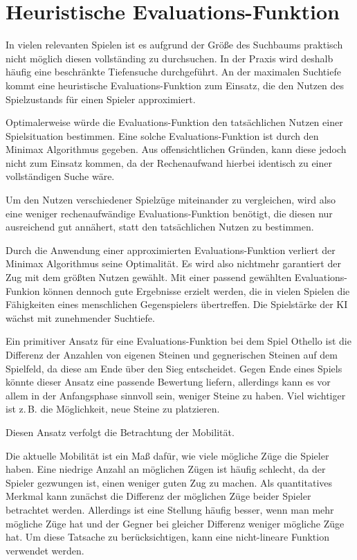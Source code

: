 \section{Heuristische Evaluations-Funktion}
\label{sec:heuristic}

In vielen relevanten Spielen ist es aufgrund der Größe des Suchbaums praktisch nicht möglich diesen vollständing zu
durchsuchen. In der Praxis wird deshalb häufig eine beschränkte Tiefensuche durchgeführt. An der maximalen Suchtiefe kommt
eine heuristische Evaluations-Funktion zum Einsatz, die den Nutzen des Spielzustands für einen Spieler approximiert.
\cite[S.~171]{ai2010russel}

Optimalerweise würde die Evaluations-Funktion den tatsächlichen Nutzen einer Spielsituation bestimmen. Eine solche
Evaluations-Funktion ist durch den Minimax Algorithmus gegeben. Aus offensichtlichen Gründen, kann diese jedoch nicht
zum Einsatz kommen, da der Rechenaufwand hierbei identisch zu einer vollständigen Suche wäre.

Um den Nutzen verschiedener Spielzüge miteinander zu vergleichen, wird also eine weniger rechenaufwändige
Evaluations-Funktion benötigt, die diesen nur ausreichend gut annähert, statt den tatsächlichen Nutzen zu bestimmen.

Durch die Anwendung einer approximierten Evaluations-Funktion verliert der Minimax Algorithmus seine Optimalität. Es
wird also nichtmehr garantiert der Zug mit dem größten Nutzen gewählt. Mit einer passend gewählten Evaluations-Funkion
können dennoch gute Ergebnisse erzielt werden, die in vielen Spielen die Fähigkeiten eines menschlichen Gegenspielers
übertreffen. Die Spielstärke der KI wächst mit zunehmender Suchtiefe.

Ein primitiver Ansatz für eine Evaluations-Funktion bei dem Spiel Othello ist die Differenz der Anzahlen von eigenen
Steinen und gegnerischen Steinen auf dem Spielfeld, da diese am Ende über den Sieg entscheidet. Gegen Ende eines Spiels
könnte dieser Ansatz eine passende Bewertung liefern, allerdings kann es vor allem in der Anfangsphase sinnvoll sein,
weniger Steine zu haben. Viel wichtiger ist z.\,B. die Möglichkeit, neue Steine zu platzieren.

Diesen Ansatz verfolgt die Betrachtung der Mobilität.

Die aktuelle Mobilität ist ein Maß dafür, wie viele mögliche Züge die Spieler haben. Eine niedrige Anzahl an möglichen
Zügen ist häufig schlecht, da der Spieler gezwungen ist, einen weniger guten Zug zu machen. Als quantitatives Merkmal
kann zunächst die Differenz der möglichen Züge beider Spieler betrachtet werden. Allerdings ist eine Stellung häufig
besser, wenn man mehr mögliche Züge hat und der Gegner bei gleicher Differenz weniger mögliche Züge hat. Um diese
Tatsache zu berücksichtigen, kann eine nicht-lineare Funktion verwendet werden.
\cite[S. 7]{evaluationfunctions}

